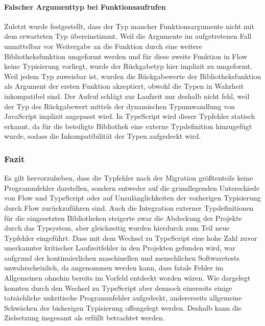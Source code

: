 \vspace{-0.5\baselineskip}
\paragraph{Falscher Argumenttyp bei Funktionsaufrufen}
Zuletzt wurde festgestellt, dass der Typ mancher Funktionsargumente nicht mit dem erwarteten Typ übereinstimmt. Weil die Argumente im aufgetretenen Fall unmittelbar vor Weitergabe an die Funktion durch eine weitere Bibliotheksfunktion umgeformt werden und für diese zweite Funktion in Flow keine Typisierung vorliegt, wurde der Rückgabetyp hier implizit zu  umgeformt. Weil  jedem Typ zuweisbar ist, wurden die Rückgabewerte der Bibliotheksfunktion als Argument der ersten Funktion akzeptiert, obwohl die Typen in Wahrheit inkompatibel sind. Der Aufruf schlägt zur Laufzeit nur deshalb nicht fehl, weil der Typ des Rückgabewert mittels der dynamischen Typumwandlung von JavaScript implizit angepasst wird. In TypeScript wird dieser Typfehler statisch erkannt, da für die beteiligte Bibliothek eine externe Typdefinition hinzugefügt wurde, sodass die Inkompatibilität der Typen aufgedeckt wird.

\subsubsection{Fazit}

Es gilt hervorzuheben, dass die Typfehler nach der Migration größtenteils keine Programmfehler darstellen, sondern entweder auf die grundlegenden Unterschiede von Flow und TypeScript oder auf Unzulänglichkeiten der vorherigen Typisierung durch Flow zurückzuführen sind. Auch die Integration externer Typdefinitionen für die eingesetzten Bibliotheken steigerte zwar die Abdeckung der Projekte durch das Typsystem, aber gleichzeitig wurden hierdurch zum Teil neue Typfehler eingeführt. Dass mit dem Wechsel zu TypeScript eine hohe Zahl zuvor unerkannter kritischer Laufzeitfehler in den Projekten gefunden wird, war aufgrund der kontinuierlichen maschinellen und menschlichen Softwaretests unwahrscheinlich, da angenommen werden kann, dass fatale Fehler im Allgemeinen ohnehin bereits im Vorfeld entdeckt worden wären. Wie dargelegt konnten durch den Wechsel zu TypeScript aber dennoch einerseits einige tatsächliche unkritische Programmfehler aufgedeckt, andererseits allgemeine Schwächen der bisherigen Typisierung offengelegt werden. Deshalb kann die Zielsetzung insgesamt als erfüllt betrachtet werden.

